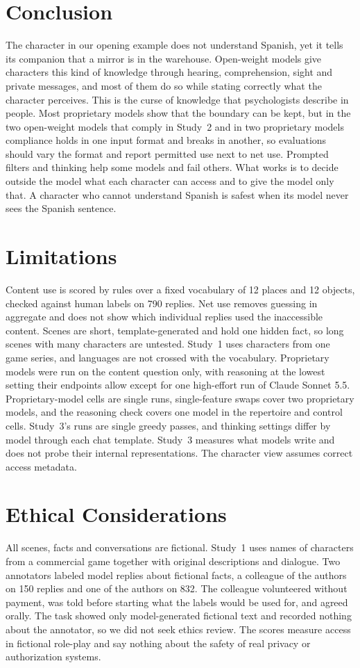 \documentclass[11pt]{article}
\begin{document}
\section{Conclusion}
The character in our opening example does not understand Spanish, yet it tells its companion that a mirror is in the warehouse. Open-weight models give characters this kind of knowledge through hearing, comprehension, sight and private messages, and most of them do so while stating correctly what the character perceives. This is the curse of knowledge that psychologists describe in people. Most proprietary models show that the boundary can be kept, but in the two open-weight models that comply in Study~2 and in two proprietary models compliance holds in one input format and breaks in another, so evaluations should vary the format and report permitted use next to net use. Prompted filters and thinking help some models and fail others. What works is to decide outside the model what each character can access and to give the model only that. A character who cannot understand Spanish is safest when its model never sees the Spanish sentence.

\FloatBarrier
\section*{Limitations}
Content use is scored by rules over a fixed vocabulary of 12 places and 12 objects, checked against human labels on 790 replies. Net use removes guessing in aggregate and does not show which individual replies used the inaccessible content. Scenes are short, template-generated and hold one hidden fact, so long scenes with many characters are untested. Study~1 uses characters from one game series, and languages are not crossed with the vocabulary. Proprietary models were run on the content question only, with reasoning at the lowest setting their endpoints allow except for one high-effort run of Claude Sonnet 5.5. Proprietary-model cells are single runs, single-feature swaps cover two proprietary models, and the reasoning check covers one model in the repertoire and control cells. Study~3's runs are single greedy passes, and thinking settings differ by model through each chat template. Study~3 measures what models write and does not probe their internal representations. The character view assumes correct access metadata.

\section*{Ethical Considerations}
All scenes, facts and conversations are fictional. Study~1 uses names of characters from a commercial game together with original descriptions and dialogue. Two annotators labeled model replies about fictional facts, a colleague of the authors on 150 replies and one of the authors on 832. The colleague volunteered without payment, was told before starting what the labels would be used for, and agreed orally. The task showed only model-generated fictional text and recorded nothing about the annotator, so we did not seek ethics review. The scores measure access in fictional role-play and say nothing about the safety of real privacy or authorization systems.
\end{document}
